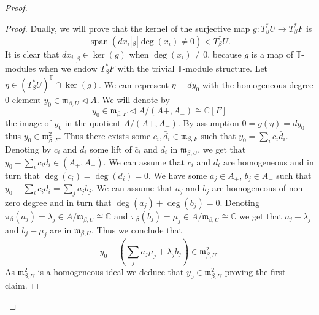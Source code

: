 \documentclass[12pt]{article}
\numberwithin{equation}{section}
\theoremstyle{remark}
\theoremstyle{definition}
\numberwithin{theorem}{section}
\def\C{\mathbb{C}}
\newcommand{\T}{{\mathbb{T}}}
\def\m{{\mathfrak m}}
\renewcommand{\1}{\mathbbm{1}}
\begin{document}
\begin{proof}
	\begin{proof} Dually, we will prove that the kernel of the surjective map $g:T^*_\beta U\to T^*_\beta F$ is $$\operatorname{span}(dx_i|_\beta| \deg(x_i)\neq 0)<T^*_\beta U.$$ It is clear that $dx_i|_\beta\in \ker(g)$ when $\deg(x_i)\neq 0$, because $g$ is a map of $\T$-modules when we endow $T^*_\beta F$ with the trivial $\T$-module structure. Let $\eta\in (T^*_\beta U)^\T\cap \ker(g)$. We can represent $\eta=d {y}_0$ with the homogeneous degree $0$ element ${y}_0\in \mathfrak{m}_{\beta,U}\triangleleft A$. We will  denote by $$\bar{y}_0\in \mathfrak{m}_{\beta,F}\triangleleft A/(A+,A_-)\cong \C[F]$$ the image of ${y}_0$ in the quotient $A/(A+,A_-)$.  By assumption $0=g(\eta)=d{\bar{y}}_0$ thus $\bar{y}_0\in \mathfrak{m}_{\beta,F}^2.$ Thus there exists some $\bar{c}_i,\bar{d}_i\in  \mathfrak{m}_{\beta,F}$ such that $\bar{y}_0=\sum_i \bar{c}_i\bar{d}_i$. Denoting by ${c}_i$ and ${d}_i$ some lift of $\bar{c}_i$ and $\bar{d}_i$ in $\mathfrak{m}_{\beta,U}$, we get that ${y_0}-\sum_i {c}_i{d}_i\in (A_+,A_-)$. We can assume that  $c_i$ and $d_i$ are homogeneous and in turn that $\deg(c_i)=\deg(d_i)=0$.   We have  some $a_j\in A_+$, $b_j\in A_-$ such that ${y_0}-\sum_i {c}_i{d}_i=\sum_j a_jb_j$. We can assume that $a_j$ and $b_j$ are homogeneous of non-zero degree and in turn that $\deg(a_j)+\deg(b_j)=0$. 
		Denoting $\pi_\beta(a_j)=\lambda_j \in A/\m_{\beta,U}\cong \C$ and $\pi_\beta(b_j)=\mu_j \in A/\m_{\beta,U}\cong \C$ we get that $a_j-\lambda_j$ and $b_j-\mu_j$ are in $\m_{\beta,U}$. Thus we  conclude that $$y_0-(\sum_j a_j \mu_j+\lambda_j b_j)\in \m_{\beta,U}^2.$$ As $\m_{\beta,U}^2$ is a homogeneous ideal we deduce that $y_0\in \m_{\beta,U}^2$ proving the first claim. 
		

\end{proof}
\end{proof}
\end{document}
